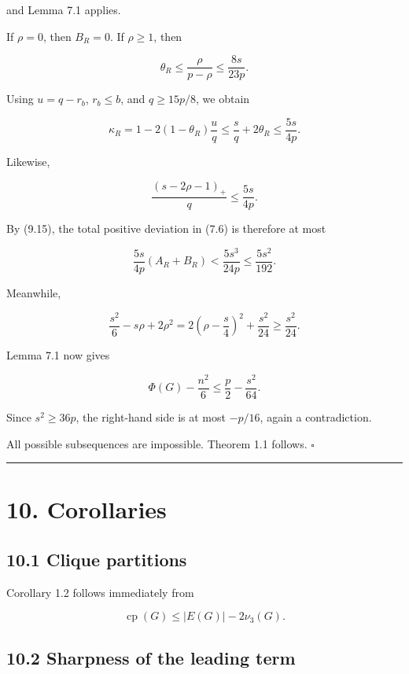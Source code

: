 \documentclass[11pt,a4paper]{article}
\begin{document}
and Lemma 7.1 applies.

If \(\rho=0\), then \(B_R=0\). If \(\rho\ge1\), then

\[
\theta_R
\le
\frac{\rho}{p-\rho}
\le
\frac{8s}{23p}.
\]

Using \(u=q-r_b\), \(r_b\le b\), and \(q\ge15p/8\), we obtain

\[
\kappa_R
=1-2(1-\theta_R)\frac uq
\le
\frac sq+2\theta_R
\le
\frac{5s}{4p}.
\tag{9.16}
\]

Likewise,

\[
\frac{(s-2\rho-1)_+}{q}
\le
\frac{5s}{4p}.
\tag{9.17}
\]

By (9.15), the total positive deviation in (7.6) is therefore at most

\[
\frac{5s}{4p}(A_R+B_R)
<
\frac{5s^3}{24p}
\le
\frac{5s^2}{192}.
\tag{9.18}
\]

Meanwhile,

\[
\frac{s^2}{6}-s\rho+2\rho^2
=
2\left(\rho-\frac s4\right)^2+\frac{s^2}{24}
\ge
\frac{s^2}{24}.
\tag{9.19}
\]

Lemma 7.1 now gives

\[
\Phi(G)-\frac{n^2}{6}
\le
\frac p2-\frac{s^2}{64}.
\tag{9.20}
\]

Since \(s^2\ge36p\), the right-hand side is at most \(-p/16\), again a contradiction.

All possible subsequences are impossible. Theorem 1.1 follows. \(\square\)

\begin{center}\rule{0.5\linewidth}{0.5pt}\end{center}

\section{10. Corollaries}\label{corollaries}

\subsection{10.1 Clique partitions}\label{clique-partitions}

Corollary 1.2 follows immediately from

\[
\operatorname{cp}(G)
\le
|E(G)|-2\nu_3(G).
\]

\subsection{10.2 Sharpness of the leading term}\label{sharpness-of-the-leading-term}
\end{document}
